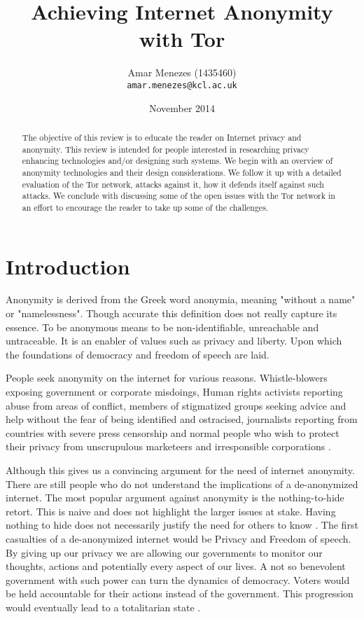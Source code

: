 \documentclass{llncs}
\begin{document}
\author{Amar Menezes (1435460)\\
\texttt{amar.menezes@kcl.ac.uk}}
\title{Achieving Internet Anonymity with Tor}
\date{November 2014}
\maketitle

\begin{abstract} 
	The objective of this review is to educate the reader on Internet privacy and anonymity. This review is intended for people interested in researching privacy enhancing technologies and/or designing such systems. We begin with an overview of anonymity technologies and their design considerations. We follow it up with a detailed evaluation of the Tor network, attacks against it, how it defends itself against such attacks. We conclude with discussing some of the open issues with the Tor network in an effort to encourage the reader to take up some of the challenges. 
\end{abstract}

\section{Introduction} \label{intro}
Anonymity is derived from the Greek word anonymia, meaning "without a name" or "namelessness". Though accurate this definition does not really capture its essence. To be anonymous means to be non-identifiable, unreachable and untraceable. It is an enabler of values such as privacy and liberty. Upon which the foundations of democracy and freedom of speech are laid.

People seek anonymity on the internet for various reasons. Whistle-blowers exposing government or corporate misdoings, Human rights activists reporting abuse from areas of conflict, members of stigmatized groups seeking advice and help without the fear of being identified and ostracised, journalists reporting from countries with severe press censorship and normal people who wish to protect their privacy from unscrupulous marketeers and irresponsible corporations \cite{seekanonymity}.

Although this gives us a convincing argument for the need of internet anonymity. There are still people who do not understand the implications of a de-anonymized internet. The most popular argument against anonymity is the nothing-to-hide retort. This is naive and does not highlight the larger issues at stake. Having nothing to hide does not necessarily justify the need for others to know \cite{thechronicle}. 
The first casualties of a de-anonymized internet would be Privacy and Freedom of speech. By giving up our privacy we are allowing our governments to monitor our thoughts, actions and potentially every aspect of our lives. A not so benevolent government with such power can turn the dynamics of democracy. Voters would be held accountable for their actions instead of the government. This progression would eventually lead to a totalitarian state \cite{privateinternetaccess}. 
\end{document}
